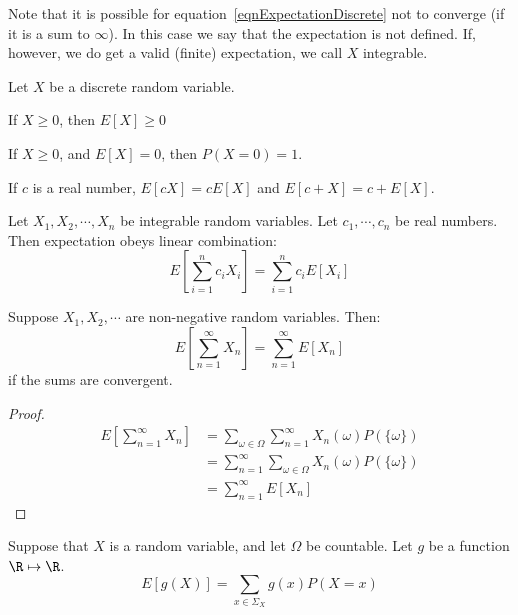 \documentclass[../Main.tex]{subfiles}
\begin{document}
Note that it is possible for equation~\ref{eqnExpectationDiscrete} not to converge (if it is a sum to $\infty$). In this case we say that the expectation is not defined. If, however, we do get a valid (finite) expectation, we call $X$ integrable.
\begin{propositions}{
        Let $X$ be a discrete random variable.
        \label{propsExpectationProps}
    }
    \item If $X \geq 0$, then $E[X] \geq 0$ \label{propExpecNonNegativity}
    \item If $X \geq 0$, and $E[X] = 0$, then $P(X = 0) = 1$. \label{propExpecZero}
    \item If $c$ is a real number, $E[cX] = cE[X]$ and $E[c + X] = c + E[X]$. \label{propExpecSumProd}
    \item Let $X_1, X_2, \cdots, X_n$ be integrable random variables. Let $c_1, \cdots, c_n$ be real numbers. Then expectation obeys linear combination:
        \begin{equation*}
            E\left[\sum_{i=1}^n c_i X_i\right] = \sum_{i=1}^n c_i E[X_i]
        \end{equation*}
        \label{propExpecLinearCombo}
\end{propositions}
\begin{lemma}
    Suppose $X_1, X_2, \cdots$ are non-negative random variables. Then:
    \begin{equation*}
        E\left[\sum_{n=1}^\infty X_n\right] = \sum_{n=1}^\infty E[X_n]
    \end{equation*}
    if the sums are convergent.
\end{lemma}
\begin{proof}
    \begin{align*}
        E\left[\sum_{n=1}^\infty X_n\right] &= \sum_{\omega \in \Omega} \sum_{n=1}^\infty X_n(\omega) P(\{\omega\}) \\
        &= \sum_{n=1}^\infty \sum_{\omega \in \Omega} X_n(\omega) P(\{\omega\}) \\
        &= \sum_{n=1}^\infty E[X_n]
    \end{align*}
\end{proof}
\begin{proposition}
    Suppose that $X$ is a random variable, and let $\Omega$ be countable. Let $g$ be a function $\R \mapsto \R$.
    \begin{equation*}
        E[g(X)] = \sum_{x \in \Sigma_X} g(x) P(X = x)
    \end{equation*}
    \label{propExpecFunc}
\end{proposition}
\end{document}
